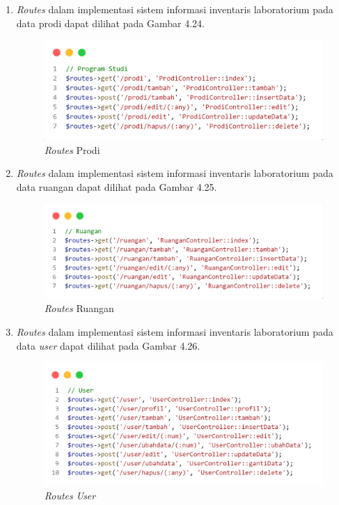 \begin{enumerate}
  \item \textit{Routes} dalam implementasi sistem informasi inventaris laboratorium pada data prodi dapat dilihat pada Gambar 4.24.

        \begin{figure}
          \centering
          \includegraphics[width=0.82\linewidth]{konten//gambar/routes prodi.png}
          \caption{\textit{Routes} Prodi}
          \label{fig:enter-label}
        \end{figure}

  \item \textit{Routes} dalam implementasi sistem informasi inventaris laboratorium pada data ruangan dapat dilihat pada Gambar 4.25.

        \begin{figure}
          \centering
          \includegraphics[width=0.82\linewidth]{konten//gambar/routes ruangan.png}
          \caption{\textit{Routes} Ruangan}
          \label{fig:enter-label}
        \end{figure}

  \item \textit{Routes} dalam implementasi sistem informasi inventaris laboratorium pada data \textit{user} dapat dilihat pada Gambar 4.26.

        \begin{figure}
          \centering
          \includegraphics[width=0.82\linewidth]{konten//gambar/routes user.png}
          \caption{\textit{Routes} \textit{User}}
          \label{fig:enter-label}
        \end{figure}
\end{enumerate}

